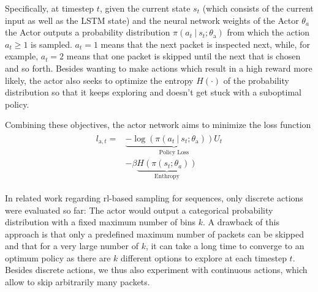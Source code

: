 \documentclass[conference]{IEEEtran}
\newcommand\givenbase[1][]{\:#1\lvert\:}
\let\given\givenbase
\begin{document}
Specifically, at timestep $t$, given the current state $s_t$ (which consists of the current input as well as the LSTM state) and the neural network weights of the Actor $\theta_a$ the Actor outputs a probability distribution $\pi \left( a_t \given s_t ; \theta_\text{a} \right)$ from which the action $a_t \ge 1$ is sampled. $a_t=1$ means that the next packet is inspected next, while, for example, $a_t=2$ means that one packet is skipped until the next that is chosen and so forth. Besides wanting to make actions which result in a high reward more likely, the actor also seeks to optimize the entropy $H(\cdot)$ of the probability distribution so that it keeps exploring and doesn't get stuck with a suboptimal policy.

Combining these objectives, the actor network aims to minimize the loss function
\begin{align}
\begin{split}
l_{\text{a},t} =& \underbrace{ -\log \left( \pi \left( a_t \given s_t ; \theta_\text{a} \right) \right) U_t}_{\text{Policy Loss}} \\
&- \beta \underbrace{H\left( \pi\left( s_t; \theta_a \right)\right) }_{\text{Enthropy}}
\end{split}\label{eq:actor}
\end{align}


In related work regarding \gls{rl}-based sampling for sequences, only discrete actions were evaluated so far: The actor would output a categorical probability distribution with a fixed maximum number of bins $k$. A drawback of this approach is that only a predefined maximum number of packets can be skipped and that for a very large number of $k$, it can take a long time to converge to an optimum policy as there are $k$ different options to explore at each timestep $t$. Besides discrete actions, we thus also experiment with continuous actions, which allow to skip arbitrarily many packets.
\end{document}
